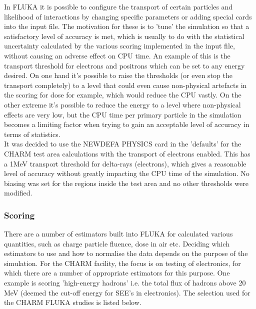 In FLUKA it is possible to configure the transport of certain particles and likelihood of interactions by changing specific parameters or adding special cards into the input file. The motivation for these is to 'tune' the simulation so that a satisfactory level of accuracy is met, which is usually to do with the statistical uncertainty calculated by the various scoring implemented in the input file, without causing an adverse effect on CPU time. An example of this is the transport threshold for electrons and positrons which can be set to any energy desired. On one hand it's possible to raise the thresholds (or even stop the transport completely) to a level that could even cause non-physical artefacts in the scoring for dose for example, which would reduce the CPU vastly. On the other extreme it's possible to reduce the energy to a level where non-physical effects are very low, but the CPU time per primary particle in the simulation becomes a limiting factor when trying to gain an acceptable level of accuracy in terms of statistics. \\

It was decided to use the NEWDEFA PHYSICS card in the 'defaults' for the CHARM test area calculations with the transport of electrons enabled. This has a 1MeV transport threshold for delta-rays (electrons), which gives a reasonable level of accuracy without greatly impacting the CPU time of the simulation. No biasing was set for the regions inside the test area and no other thresholds were modified. \\

\subsubsection{Scoring}

There are a number of estimators built into FLUKA for calculated various quantities, such as charge particle fluence, dose in air etc. Deciding which estimators to use and how to normalise the data depends on the purpose of the simulation. For the CHARM facility, the focus is on testing of electronics, for which there are a number of appropriate estimators for this purpose. One example is scoring 'high-energy hadrons' i.e. the total flux of hadrons above 20 MeV (deemed the cut-off energy for SEE's in electronics). The selection used for the CHARM FLUKA studies is listed below.

